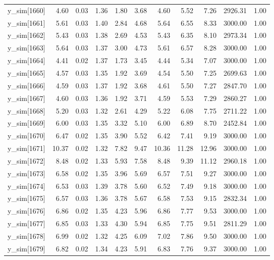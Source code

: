 \begin{table}[ht]
\begin{tabular}{rrrrrrrrrrr}
  y\_sim[1660] & 4.60 & 0.03 & 1.36 & 1.80 & 3.68 & 4.60 & 5.52 & 7.26 & 2926.31 & 1.00 \\ 
  y\_sim[1661] & 5.61 & 0.03 & 1.40 & 2.84 & 4.68 & 5.64 & 6.55 & 8.33 & 3000.00 & 1.00 \\ 
  y\_sim[1662] & 5.43 & 0.03 & 1.38 & 2.69 & 4.53 & 5.43 & 6.35 & 8.10 & 2973.34 & 1.00 \\ 
  y\_sim[1663] & 5.64 & 0.03 & 1.37 & 3.00 & 4.73 & 5.61 & 6.57 & 8.28 & 3000.00 & 1.00 \\ 
  y\_sim[1664] & 4.41 & 0.02 & 1.37 & 1.73 & 3.45 & 4.44 & 5.34 & 7.07 & 3000.00 & 1.00 \\ 
  y\_sim[1665] & 4.57 & 0.03 & 1.35 & 1.92 & 3.69 & 4.54 & 5.50 & 7.25 & 2699.63 & 1.00 \\ 
  y\_sim[1666] & 4.59 & 0.03 & 1.37 & 1.92 & 3.68 & 4.61 & 5.50 & 7.27 & 2847.70 & 1.00 \\ 
  y\_sim[1667] & 4.60 & 0.03 & 1.36 & 1.92 & 3.71 & 4.59 & 5.53 & 7.29 & 2860.27 & 1.00 \\ 
  y\_sim[1668] & 5.20 & 0.03 & 1.32 & 2.61 & 4.29 & 5.22 & 6.08 & 7.75 & 2711.22 & 1.00 \\ 
  y\_sim[1669] & 6.00 & 0.03 & 1.35 & 3.32 & 5.10 & 6.00 & 6.89 & 8.70 & 2452.84 & 1.00 \\ 
  y\_sim[1670] & 6.47 & 0.02 & 1.35 & 3.90 & 5.52 & 6.42 & 7.41 & 9.19 & 3000.00 & 1.00 \\ 
  y\_sim[1671] & 10.37 & 0.02 & 1.32 & 7.82 & 9.47 & 10.36 & 11.28 & 12.96 & 3000.00 & 1.00 \\ 
  y\_sim[1672] & 8.48 & 0.02 & 1.33 & 5.93 & 7.58 & 8.48 & 9.39 & 11.12 & 2960.18 & 1.00 \\ 
  y\_sim[1673] & 6.58 & 0.02 & 1.35 & 3.96 & 5.69 & 6.57 & 7.51 & 9.27 & 3000.00 & 1.00 \\ 
  y\_sim[1674] & 6.53 & 0.03 & 1.39 & 3.78 & 5.60 & 6.52 & 7.49 & 9.18 & 3000.00 & 1.00 \\ 
  y\_sim[1675] & 6.57 & 0.03 & 1.36 & 3.78 & 5.67 & 6.58 & 7.53 & 9.15 & 2832.34 & 1.00 \\ 
  y\_sim[1676] & 6.86 & 0.02 & 1.35 & 4.23 & 5.96 & 6.86 & 7.77 & 9.53 & 3000.00 & 1.00 \\ 
  y\_sim[1677] & 6.85 & 0.03 & 1.33 & 4.30 & 5.94 & 6.85 & 7.75 & 9.51 & 2811.29 & 1.00 \\ 
  y\_sim[1678] & 6.99 & 0.02 & 1.32 & 4.25 & 6.09 & 7.02 & 7.86 & 9.50 & 3000.00 & 1.00 \\ 
  y\_sim[1679] & 6.82 & 0.02 & 1.34 & 4.23 & 5.91 & 6.83 & 7.76 & 9.37 & 3000.00 & 1.00 \\ 

\end{tabular}
\end{table}
